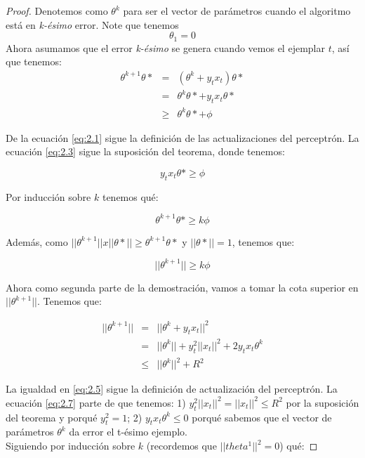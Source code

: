 \begin{proof}
Denotemos como $\theta^k$ para ser el vector de parámetros cuando el
algoritmo está en \textit{k-ésimo} error. Note que tenemos
\begin{equation*}
\theta_1 = 0
\end{equation*}
Ahora asumamos que el error \textit{k-ésimo} se genera cuando vemos el
ejemplar $t$, así que tenemos:
\begin{eqnarray}
  \theta^{k+1}\theta* & = & (\theta^k + y_tx_t)\theta* \label{eq:2.1}\\
                      & = & \theta^k\theta* + y_tx_t\theta* \label{eq:2.2}\\
                      & \geq & \theta^k\theta* + \phi \label{eq:2.3}
\end{eqnarray}

De la ecuación \ref{eq:2.1} sigue la definición de las actualizaciones
del perceptrón. La ecuación \ref{eq:2.3} sigue la suposición del
teorema, donde tenemos:

\begin{equation*}
  y_tx_t\theta* \geq \phi
\end{equation*}

Por inducción sobre $k$ tenemos qué:

\begin{equation*}
  \theta^{k+1}\theta* \geq k\phi
\end{equation*}

Además, como $||\theta^{k+1}|| x ||\theta*|| \geq \theta^{k+1}\theta*$
y $||\theta*|| = 1 $, tenemos que:

\begin{equation}
  \label{eq:2.4}
  ||\theta^{k+1}|| \geq k\phi
\end{equation}

Ahora como segunda parte de la demostración, vamos a tomar la cota
superior en $||\theta^{k+1}||$. Tenemos que:

\begin{eqnarray}
  ||\theta^{k+1}|| & = & ||\theta^k + y_tx_t||^2 \label{eq:2.5}\\
                   & = & ||\theta^k|| + y_t^2||x_t||^2 +
                         2y_tx_t\theta^k \label{eq:2.6}\\
                   & \leq & ||\theta^k||^2 + R^2 \label{eq:2.7}
\end{eqnarray}

La igualdad en \ref{eq:2.5} sigue la definición de actualización del
perceptrón. La ecuación \ref{eq:2.7} parte de que tenemos: 1)
$y_t^2||x_t||^2 = ||x_t||^2 \leq R^2$ por la suposición del teorema y
porqué $y_t^2=1$; 2) $y_tx_t\theta^k \leq 0$ porqué sabemos que el
vector de parámetros $\theta^k$ da error el t-ésimo ejemplo.\\
Siguiendo por inducción sobre $k$ (recordemos que $||theta^1||^2 = 0$)
qué:


\end{proof}
